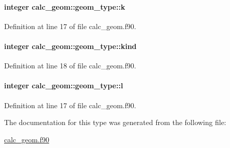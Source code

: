 \hypertarget{structcalc__geom_1_1geom__type_abc65c629be65ea1c0a14943b76db8e92}{
\paragraph[{k}]{\setlength{\rightskip}{0pt plus 5cm}integer calc\-\_\-geom\-::geom\-\_\-type\-::k}}\label{structcalc__geom_1_1geom__type_abc65c629be65ea1c0a14943b76db8e92}


Definition at line 17 of file calc\-\_\-geom.\-f90.

\hypertarget{structcalc__geom_1_1geom__type_aec4da2a1ff4b31aebb3359747951a1dd}{
\paragraph[{kind}]{\setlength{\rightskip}{0pt plus 5cm}integer calc\-\_\-geom\-::geom\-\_\-type\-::kind}}\label{structcalc__geom_1_1geom__type_aec4da2a1ff4b31aebb3359747951a1dd}


Definition at line 18 of file calc\-\_\-geom.\-f90.

\hypertarget{structcalc__geom_1_1geom__type_a7cc1284b731630012ebecb15813c47a0}{
\paragraph[{l}]{\setlength{\rightskip}{0pt plus 5cm}integer calc\-\_\-geom\-::geom\-\_\-type\-::l}}\label{structcalc__geom_1_1geom__type_a7cc1284b731630012ebecb15813c47a0}


Definition at line 17 of file calc\-\_\-geom.\-f90.



The documentation for this type was generated from the following file\-:\begin{DoxyCompactItemize}
\item 
\hyperlink{calc__geom_8f90}{calc\-\_\-geom.\-f90}\end{DoxyCompactItemize}
